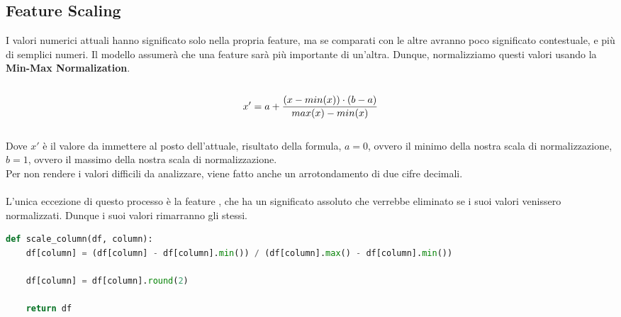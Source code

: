 \documentclass[a4paper,12pt]{report}
\begin{document}
\subsection{Feature Scaling}
I valori numerici attuali hanno significato solo nella propria feature, ma se comparati con le altre avranno poco significato contestuale, e più di semplici numeri. Il modello assumerà che una feature sarà più importante di un'altra. Dunque, normalizziamo questi valori usando la \textbf{Min-Max Normalization}.\\
\\
\[
    x' = a \space + \space \frac{(x \space - \space min(x)) \space \cdot \space (b \space - \space a)}{max(x) \space - \space min(x)}
\]\\
Dove \(x'\) è il valore da immettere al posto dell'attuale, risultato della formula, \(a = 0\), ovvero il minimo della nostra scala di normalizzazione, \(b = 1\), ovvero il massimo della nostra scala di normalizzazione.\\
Per non rendere i valori difficili da analizzare, viene fatto anche un arrotondamento di due cifre decimali.\\
\\
L'unica eccezione di questo processo è la feature \texttt{\color{red}{upload\_hour}}, che ha un significato assoluto che verrebbe eliminato se i suoi valori venissero normalizzati. Dunque i suoi valori rimarranno gli stessi.\\
\begin{lstlisting}[language=Python]
def scale_column(df, column):
    df[column] = (df[column] - df[column].min()) / (df[column].max() - df[column].min())
    
    df[column] = df[column].round(2)

    return df
\end{lstlisting}
\newpage
\end{document}

